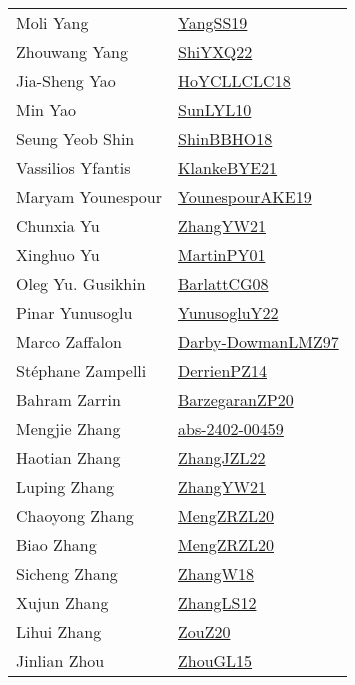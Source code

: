 {\begin{longtable}{p{4cm}p{20cm}}
Moli Yang & \href{papers/YangSS19.pdf}{YangSS19}\cite{YangSS19} \\
Zhouwang Yang & \href{}{ShiYXQ22}\cite{ShiYXQ22} \\
Jia{-}Sheng Yao & \href{papers/HoYCLLCLC18.pdf}{HoYCLLCLC18}\cite{HoYCLLCLC18} \\
Min Yao & \href{papers/SunLYL10.pdf}{SunLYL10}\cite{SunLYL10} \\
Seung Yeob Shin & \href{articles/ShinBBHO18.pdf}{ShinBBHO18}\cite{ShinBBHO18} \\
Vassilios Yfantis & \href{papers/KlankeBYE21.pdf}{KlankeBYE21}\cite{KlankeBYE21} \\
Maryam Younespour & \href{}{YounespourAKE19}\cite{YounespourAKE19} \\
Chunxia Yu & \href{articles/ZhangYW21.pdf}{ZhangYW21}\cite{ZhangYW21} \\
Xinghuo Yu & \href{articles/MartinPY01.pdf}{MartinPY01}\cite{MartinPY01} \\
Oleg Yu. Gusikhin & \href{papers/BarlattCG08.pdf}{BarlattCG08}\cite{BarlattCG08} \\
Pinar Yunusoglu & \href{}{YunusogluY22}\cite{YunusogluY22} \\
Marco Zaffalon & \href{articles/Darby-DowmanLMZ97.pdf}{Darby-DowmanLMZ97}\cite{Darby-DowmanLMZ97} \\
St{\'{e}}phane Zampelli & \href{papers/DerrienPZ14.pdf}{DerrienPZ14}\cite{DerrienPZ14} \\
Bahram Zarrin & \href{papers/BarzegaranZP20.pdf}{BarzegaranZP20}\cite{BarzegaranZP20} \\
Mengjie Zhang & \href{articles/abs-2402-00459.pdf}{abs-2402-00459}\cite{abs-2402-00459} \\
Haotian Zhang & \href{papers/ZhangJZL22.pdf}{ZhangJZL22}\cite{ZhangJZL22} \\
Luping Zhang & \href{articles/ZhangYW21.pdf}{ZhangYW21}\cite{ZhangYW21} \\
Chaoyong Zhang & \href{articles/MengZRZL20.pdf}{MengZRZL20}\cite{MengZRZL20} \\
Biao Zhang & \href{articles/MengZRZL20.pdf}{MengZRZL20}\cite{MengZRZL20} \\
Sicheng Zhang & \href{articles/ZhangW18.pdf}{ZhangW18}\cite{ZhangW18} \\
Xujun Zhang & \href{papers/ZhangLS12.pdf}{ZhangLS12}\cite{ZhangLS12} \\
Lihui Zhang & \href{}{ZouZ20}\cite{ZouZ20} \\
Jinlian Zhou & \href{papers/ZhouGL15.pdf}{ZhouGL15}\cite{ZhouGL15} \\

\end{longtable}}
